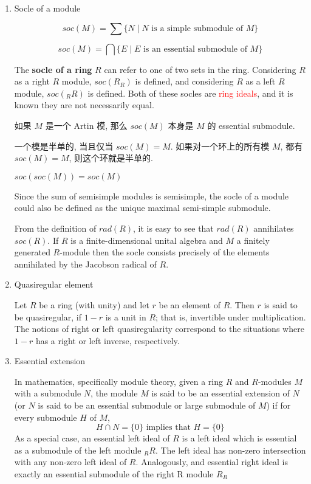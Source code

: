 \documentclass{ctexart}
\begin{document}
\begin{enumerate}
\item Socle of a module\cite{socle_of_a_module}

\[
soc(M) = \sum\{ N \mid N \mbox{ is a simple submodule of } M \}
\]

\[
soc(M) = \bigcap\{ E \mid E \mbox{ is an essential submodule of } M \}
\]

The \textbf{socle of a ring} $R$ can refer to one of two sets in the ring. Considering $R$ as a right $R$ module, $soc(R_R)$ is defined, and considering $R$ as a left $R$ module, $soc(_RR)$ is defined. Both of these socles are \textcolor{red}{ring ideals}, and it is known they are not necessarily equal.

如果 $M$ 是一个 Artin 模, 那么 $soc(M)$ 本身是 $M$ 的 essential submodule.

一个模是半单的, 当且仅当 $soc(M) = M$. 如果对一个环上的所有模 $M$, 都有 $soc(M) = M$, 则这个环就是半单的.

$soc(soc(M)) = soc(M)$

Since the sum of semisimple modules is semisimple, the socle of a module could also be defined as the unique maximal semi-simple submodule.

From the definition of $rad(R)$, it is easy to see that $rad(R)$ annihilates $soc(R)$. If $R$ is a finite-dimensional unital algebra and $M$ a finitely generated $R$-module then the socle consists precisely of the elements annihilated by the Jacobson radical of $R$.

\item Quasiregular element\cite{quasiregular_element}

Let $R$ be a ring (with unity) and let $r$ be an element of $R$. Then $r$ is said to be quasiregular, if $1 - r$ is a unit in $R$; that is, invertible under multiplication. The notions of right or left quasiregularity correspond to the situations where $1 - r$ has a right or left inverse, respectively.

\item Essential extension\cite{essential_extension}

In mathematics, specifically module theory, given a ring $R$ and $R$-modules $M$ with a submodule $N$, the module $M$ is said to be an essential extension of $N$ (or $N$ is said to be an essential submodule or large submodule of $M$) if for every submodule $H$ of $M$,
\[
    H \cap N = \{ 0 \} \mbox{ implies that } H = \{ 0 \}
\]
As a special case, an essential left ideal of $R$ is a left ideal which is essential as a submodule of the left module $_RR$. The left ideal has non-zero intersection with any non-zero left ideal of $R$. Analogously, and essential right ideal is exactly an essential submodule of the right R module $R_R$


\end{enumerate}
\end{document}
